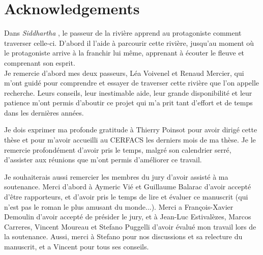 \chapter*{Acknowledgements}
    
Dans \textsl{Siddhartha} , le passeur de la rivière apprend au protagoniste comment traverser celle-ci. D'abord il l'aide à parcourir cette rivière, jusqu'au moment où le protagoniste arrive à la franchir lui même, apprenant à écouter le fleuve et comprenant son esprit. \\  %
%
Je remercie d'abord mes deux passeurs, Léa Voivenel et Renaud Mercier, qui m'ont guidé pour comprendre et essayer de traverser cette rivière que l'on appelle recherche. Leurs conseils, leur inestimable aide, leur grande disponibilité et leur patience m'ont permis d'aboutir ce projet qui m'a prit tant d'effort et de temps dans les dernières années.

Je dois exprimer ma profonde gratitude à Thierry Poinsot pour avoir dirigé cette thèse et pour m'avoir accueilli au CERFACS les derniers mois de ma thèse. Je le remercie profondément d'avoir pris le temps, malgré son calendrier serré, d'assister aux réunions que m'ont permis d'améliorer ce travail.

Je souhaiterais aussi remercier les membres du jury d'avoir assisté à ma soutenance. Merci d'abord à Aymeric Vié et Guillaume Balarac d'avoir accepté d'être  rapporteurs, et d'avoir pris le temps de lire et évaluer ce manuscrit (qui n'est pas le roman le plus amusant du monde...).  Merci a François-Xavier Demoulin d'avoir accepté de présider le jury, et à Jean-Luc Estivalèzes, Marcos Carreres, Vincent Moureau et Stefano Puggelli d'avoir évalué  mon travail lors de la soutenance. Aussi, merci à Stefano pour nos discussions et sa relecture du manuscrit, et a Vincent pour tous ses conseils.

